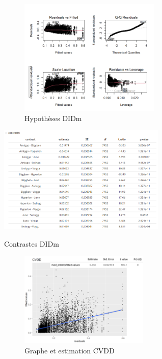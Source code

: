 \newpage

\label{an:DIDm}
\begin{figure}[ht]
\centering
\includegraphics[width=0.6\textwidth]{Image/hypothese DIDm.png}
\caption{Hypothèses DIDm}
\end{figure}
\begin{table}[ht]
\centering
\includegraphics[width=0.6\textwidth]{Image/contrast DIDm.png}
\caption{Contrastes DIDm}
\end{table}

\newpage

\label{an:CVDD}
\begin{figure}[ht]
\centering
\includegraphics[width=0.55\textwidth]{Image/CVDD.png}
\caption{Graphe et estimation CVDD}
\end{figure}

\newpage

